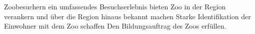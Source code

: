 %
{}{Zoobesuchern ein umfassendes Besuchserlebnis bieten \newline Zoo in der Region verankern und über die Region hinaus bekannt machen \newline Starke Identifikation der Einwohner mit dem Zoo schaffen \newline Den Bildungsauftrag des Zoos erfüllen.}%
{}{}%
{}%